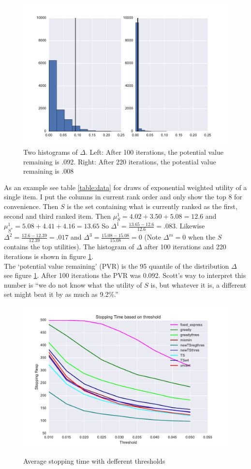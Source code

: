 \documentclass[nonblindrev]{informs3}
\begin{document}
\begin{figure}
\includegraphics[width=1\linewidth]{plots/valremhist.pdf}
\caption{Two histograms of $\Delta$. Left: After 100 iterations, the potential value remaining is .092. Right: After 220 iterations, the potential value remaining is .008}
\label{fig:data}
\end{figure}
As an example see table \ref{table:data} for draws of exponential weighted utility of a single item. I put the columns in current rank order and only show the top 8 for convenience. Then $S$ is the set containing what is currently ranked as the first, second and third ranked item. Then $\mu^1_{S}=4.02+3.50+5.08=12.6$ and $\mu_{S^*}^{1}=5.08+4.41+4.16=13.65$ So $\Delta^{1}=\frac{13.65-12.6}{12.6}=.083$. Likewise $\Delta^{2}=\frac{12.6-12.39}{12.39}=.017$ and $\Delta^{3}=\frac{15.08-15.08}{15.08}=0$ (Note $\Delta^m=0$ when the $S$ contains the top utilities). The histogram of $\Delta$ after 100 iterations and 220 iterations is shown in figure \ref{fig:data}. \\
The `potential value remaining' (PVR) is the 95 quantile of the distribution $\Delta$ see figure \ref{fig:data}. After 100 iterations the PVR was 0.092. Scott's way to interpret this number is ``we do not know what the utility of $S$ is, but whatever it is, a different set might beat it by as much as 9.2\%.''\\
\begin{figure}
\caption{Average stopping time with defferent thresholds}
\includegraphics[width=1\textwidth]{plots/stoppingtimes.pdf}
\label{fig:st}
\end{figure}
\end{document}
